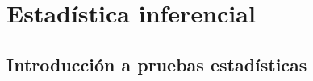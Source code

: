 \documentclass{AsignaturaResumen}
\begin{document}
    \frontmatter

\Portada
\Indices

    \mainmatter


\part{Estadística inferencial}

    \chapter{Introducción a pruebas estadísticas} 
%    
%


\end{document}
